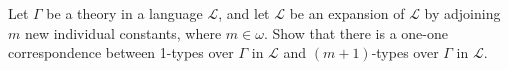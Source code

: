 Let $\Gamma$ be a theory in a language $\mathcal{L}$, and let $\mathcal{L}$ be an expansion of $\mathcal{L}$ by adjoining $m$ new individual constants, where $m \in \omega$. Show that there is a one-one correspondence between 1-types over $\Gamma$ in $\mathcal{L}$ and $(m + 1)$-types over $\Gamma$ in $\mathcal{L}$.
